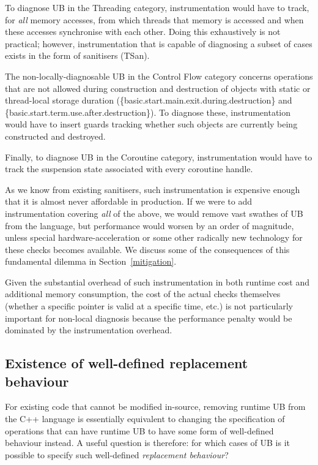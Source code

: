 To diagnose UB in the Threading category, instrumentation would have to track, for \emph{all} memory accesses, from which threads that memory is accessed and when these accesses synchronise with each other. Doing this exhaustively is not practical; however, instrumentation that is capable of diagnosing a subset of cases exists in the form of sanitisers (TSan).

The non-locally-diagnosable UB in the Control Flow category concerns operations that are not allowed during construction and destruction of objects with static or thread-local storage duration (\{basic.start.main.exit.during.destruction\} and \{basic.start.term.use.after.destruction\}). To diagnose these, instrumentation would have to insert guards tracking whether such objects are currently being constructed and destroyed.  

Finally, to diagnose UB in the Coroutine category, instrumentation would have to track the suspension state associated with every coroutine handle.

As we know from existing sanitisers, such instrumentation is expensive enough that it is almost never affordable in production. If we were to add instrumentation covering \emph{all} of the above, we would remove vast swathes of UB from the language, but performance would worsen by an order of magnitude, unless special hardware-acceleration or some other radically new technology for these checks becomes available. We discuss some of the consequences of this fundamental dilemma in Section~\ref{mitigation}.

Given the substantial overhead of such instrumentation in both runtime cost and additional memory consumption, the cost of the actual checks themselves (whether a specific pointer is valid at a specific time, etc.) is not particularly important for non-local diagnosis because the performance penalty would be dominated by the instrumentation overhead.

\subsection{Existence of well-defined replacement behaviour}
\label{fallback}

For existing code that cannot be modified in-source, removing runtime UB from the C++ language is essentially equivalent to changing the specification of operations that can have runtime UB to have some form of well-defined behaviour instead. A useful question is therefore: for which cases of UB is it possible to specify such well-defined \emph{replacement behaviour}?

